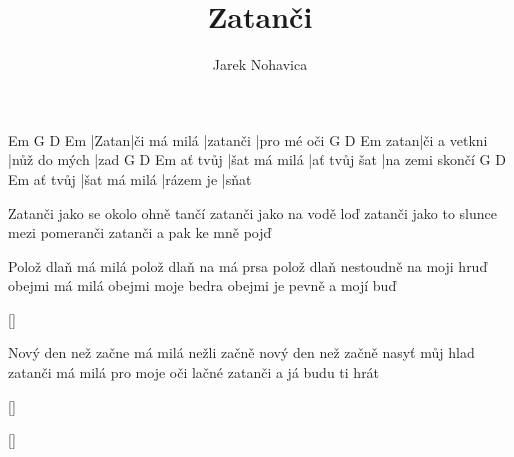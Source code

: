 \documentclass{song}
\title{Zatanči}
\author{Jarek Nohavica}
\begin{document}
\strophe
Em    G           D        Em
|Zatan|či má milá |zatanči |pro mé oči
     G            D            Em
zatan|či a vetkni |nůž do mých |zad
        G            D            Em
ať tvůj |šat má milá |ať tvůj šat |na zemi skončí
        G            D         Em
ať tvůj |šat má milá |rázem je |sňat
\endstrophe

Zatanči jako se okolo ohně tančí
zatanči jako na vodě loď
zatanči jako to slunce mezi pomeranči
zatanči a pak ke mně pojď
\endstrophe

\strophe*
Polož dlaň má milá polož dlaň na má prsa
polož dlaň nestoudně na moji hruď
obejmi má milá obejmi moje bedra
obejmi je pevně a mojí buď
\endstrophe

\ref{}

\strophe*
Nový den než začne má milá nežli začně
nový den než začně nasyť můj hlad
zatanči má milá pro moje oči lačné
zatanči a já budu ti hrát
\endstrophe

\ref{}

\ref{}
\end{document}
